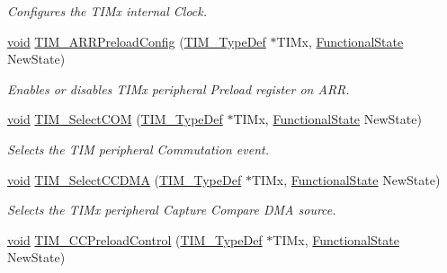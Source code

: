 \begin{DoxyCompactItemize}
\begin{DoxyCompactList}\small\item\em Configures the T\+I\+Mx internal Clock. \end{DoxyCompactList}\item 
\hyperlink{usb__devapi_8h_afabf60e7f57651d6d595a02c75f07cd0}{void} \hyperlink{group___t_i_m___exported___functions_ga42b44b9fc2b0798d733720dd6bac1ac0}{T\+I\+M\+\_\+\+A\+R\+R\+Preload\+Config} (\hyperlink{struct_t_i_m___type_def}{T\+I\+M\+\_\+\+Type\+Def} $\ast$T\+I\+Mx, \hyperlink{agilefox_2library_2inc_2stm32f10x__type_8h_ac9a7e9a35d2513ec15c3b537aaa4fba1}{Functional\+State} New\+State)
\begin{DoxyCompactList}\small\item\em Enables or disables T\+I\+Mx peripheral Preload register on A\+RR. \end{DoxyCompactList}\item 
\hyperlink{usb__devapi_8h_afabf60e7f57651d6d595a02c75f07cd0}{void} \hyperlink{group___t_i_m___exported___functions_gaff2e7f9959b1b36e830df028c14accc8}{T\+I\+M\+\_\+\+Select\+C\+OM} (\hyperlink{struct_t_i_m___type_def}{T\+I\+M\+\_\+\+Type\+Def} $\ast$T\+I\+Mx, \hyperlink{agilefox_2library_2inc_2stm32f10x__type_8h_ac9a7e9a35d2513ec15c3b537aaa4fba1}{Functional\+State} New\+State)
\begin{DoxyCompactList}\small\item\em Selects the T\+IM peripheral Commutation event. \end{DoxyCompactList}\item 
\hyperlink{usb__devapi_8h_afabf60e7f57651d6d595a02c75f07cd0}{void} \hyperlink{group___t_i_m___exported___functions_ga5273cb65acb885fe7982827b1c6b7d75}{T\+I\+M\+\_\+\+Select\+C\+C\+D\+MA} (\hyperlink{struct_t_i_m___type_def}{T\+I\+M\+\_\+\+Type\+Def} $\ast$T\+I\+Mx, \hyperlink{agilefox_2library_2inc_2stm32f10x__type_8h_ac9a7e9a35d2513ec15c3b537aaa4fba1}{Functional\+State} New\+State)
\begin{DoxyCompactList}\small\item\em Selects the T\+I\+Mx peripheral Capture Compare D\+MA source. \end{DoxyCompactList}\item 
\hyperlink{usb__devapi_8h_afabf60e7f57651d6d595a02c75f07cd0}{void} \hyperlink{group___t_i_m___exported___functions_ga0a935254e44312b1d78e8684a58db3c1}{T\+I\+M\+\_\+\+C\+C\+Preload\+Control} (\hyperlink{struct_t_i_m___type_def}{T\+I\+M\+\_\+\+Type\+Def} $\ast$T\+I\+Mx, \hyperlink{agilefox_2library_2inc_2stm32f10x__type_8h_ac9a7e9a35d2513ec15c3b537aaa4fba1}{Functional\+State} New\+State)

\end{DoxyCompactItemize}
